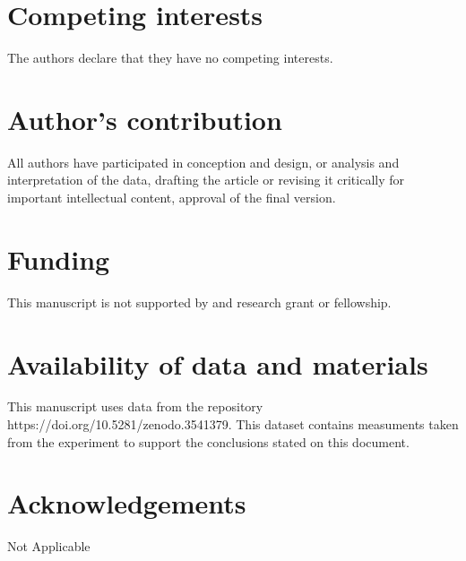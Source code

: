 \documentclass[twocolumn, notitlepage]{bmcart}%
\begin{document}

\begin{backmatter}

\section*{Competing interests}
  The authors declare that they have no competing interests.
  
\section*{Author's contribution}
  All authors have participated in conception and design, or analysis and
  interpretation of the data, drafting the article or revising it critically for
  important intellectual content, approval of the final version.
  
\section*{Funding}
  This manuscript is not supported by and research grant or fellowship.
  
\section*{Availability of data and materials}
  This manuscript uses data from the repository https://doi.org/10.5281/zenodo.3541379. 
  This dataset contains measuments taken from the experiment to support the conclusions
  stated on this document.
  
\section*{Acknowledgements}
    Not Applicable
  



\end{backmatter}
\end{document}
